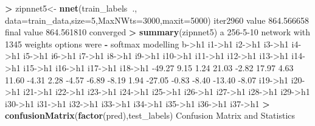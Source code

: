 \documentclass[]{article}
\newenvironment{Shaded}{\begin{snugshade}}{\end{snugshade}}
\newcommand{\KeywordTok}[1]{\textcolor[rgb]{0.13,0.29,0.53}{\textbf{#1}}}
\newcommand{\DataTypeTok}[1]{\textcolor[rgb]{0.13,0.29,0.53}{#1}}
\newcommand{\DecValTok}[1]{\textcolor[rgb]{0.00,0.00,0.81}{#1}}
\newcommand{\FloatTok}[1]{\textcolor[rgb]{0.00,0.00,0.81}{#1}}
\newcommand{\StringTok}[1]{\textcolor[rgb]{0.31,0.60,0.02}{#1}}
\newcommand{\OperatorTok}[1]{\textcolor[rgb]{0.81,0.36,0.00}{\textbf{#1}}}
\newcommand{\NormalTok}[1]{#1}
\begin{document}
\begin{Shaded}
\begin{Highlighting}[]
\OperatorTok{>}\StringTok{ }\NormalTok{zipnnet5<-}\StringTok{ }\KeywordTok{nnet}\NormalTok{(train_labels}\OperatorTok{~}\NormalTok{., }\DataTypeTok{data=}\NormalTok{train_data,}\DataTypeTok{size=}\DecValTok{5}\NormalTok{,}\DataTypeTok{MaxNWts=}\DecValTok{3000}\NormalTok{,}\DataTypeTok{maxit=}\DecValTok{5000}\NormalTok{)}
\NormalTok{iter2960 value }\FloatTok{864.566658}
\NormalTok{final  value }\FloatTok{864.561810} 
\NormalTok{converged}
\OperatorTok{>}\StringTok{ }\KeywordTok{summary}\NormalTok{(zipnnet5)}
\NormalTok{a }\DecValTok{256-5-10}\NormalTok{ network with }\DecValTok{1345}\NormalTok{ weights}
\NormalTok{options were }\OperatorTok{-}\StringTok{ }\NormalTok{softmax modelling }
\NormalTok{   b->h1   i1->h1   i2->h1   i3->h1   i4->h1   i5->h1   i6->h1   i7->h1   i8->h1   i9->h1  i10->h1  i11->h1  i12->h1  i13->h1  i14->h1  i15->h1  i16->h1  i17->h1  i18->h1 }
  \FloatTok{-49.27}     \FloatTok{9.15}     \FloatTok{1.24}    \FloatTok{21.03}    \FloatTok{-2.82}    \FloatTok{17.97}     \FloatTok{4.63}    \FloatTok{11.60}    \FloatTok{-4.31}     \FloatTok{2.28}    \FloatTok{-4.57}    \FloatTok{-6.89}    \FloatTok{-8.19}     \FloatTok{1.94}   \FloatTok{-27.05}    \FloatTok{-0.83}    \FloatTok{-8.40}   \FloatTok{-13.40}    \FloatTok{-8.07} 
\NormalTok{ i19->h1  i20->h1  i21->h1  i22->h1  i23->h1  i24->h1  i25->h1  i26->h1  i27->h1  i28->h1  i29->h1  i30->h1  i31->h1  i32->h1  i33->h1  i34->h1  i35->h1  i36->h1  i37->h1 }
\OperatorTok{>}\StringTok{ }\KeywordTok{confusionMatrix}\NormalTok{(}\KeywordTok{factor}\NormalTok{(pred),test_labels)}
\NormalTok{Confusion Matrix and Statistics}


\end{Highlighting}
\end{Shaded}
\end{document}
